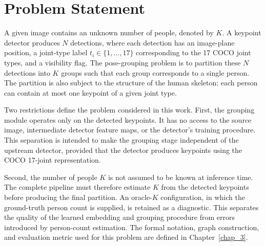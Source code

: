 \section{Problem Statement}
\label{sec_intro_problem}

A given image contains an unknown number of people, denoted by $K$.
A keypoint detector produces $N$ detections, where each detection has an
image-plane position, a joint-type label $t_i \in \{1,\dots,17\}$
corresponding to the 17 COCO joint types, and a visibility flag.
The pose-grouping problem is to partition these $N$ detections into $K$
groups such that each group corresponds to a single person. The
partition is also subject to the structure of the human skeleton: each
person can contain at most one keypoint of a given joint type.

Two restrictions define the problem considered in this work. First, the
grouping module operates only on the detected keypoints. It has no access
to the source image, intermediate detector feature maps, or the
detector's training procedure. This separation is intended to make the
grouping stage independent of the upstream detector, provided that the
detector produces keypoints using the COCO 17-joint representation.

Second, the number of people $K$ is not assumed to be known at inference
time. The complete pipeline must therefore estimate $K$ from the
detected keypoints before producing the final partition. An oracle-$K$
configuration, in which the ground-truth person count is supplied, is
retained as a diagnostic. This separates the quality of the learned
embedding and grouping procedure from errors introduced by person-count
estimation. The formal notation, graph construction, and evaluation
metric used for this problem are defined in Chapter~\ref{chap_3}.